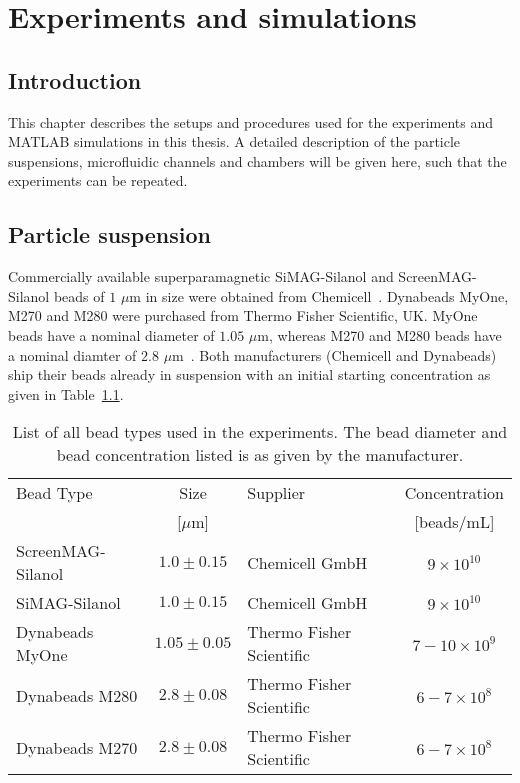 \chapter{Experiments and simulations}\label{ch:experiments}

\section{Introduction}
This chapter describes the setups and procedures used for the experiments and MATLAB simulations in this thesis. A detailed description of the particle suspensions, microfluidic channels and chambers will be given here, such that the experiments can be repeated.

\section{Particle suspension}\label{sec:particleSuspension}
Commercially available superparamagnetic SiMAG-Silanol and ScreenMAG-Silanol beads of $1$ $\mu$m in size were obtained from Chemicell~\cite{chemicell2015}. Dynabeads MyOne, M270 and M280 were purchased from Thermo Fisher Scientific, UK. MyOne beads have a nominal diameter of $1.05$ $\mu$m, whereas M270 and M280 beads have a nominal diamter of $2.8$ $\mu$m~\cite{dynabeads2015}. Both manufacturers (Chemicell and Dynabeads) ship their beads already in suspension with an initial starting concentration as given in Table~\ref{tab:particleSuspensionMaterials}.

\begin{table}[htb]
\begin{center}
\caption[Bead types used in the experiments]{List of all bead types used in the experiments. The bead diameter and bead concentration listed is as given by the manufacturer.}
\vspace{1ex}
\label{tab:particleSuspensionMaterials}
\begin{tabular}{lclc}
\hline
Bead Type 	& Size 				& Supplier 	& Concentration\\ 
					& 	[$\mu$m]  	&  				& [beads/mL]\\
\hline
ScreenMAG-Silanol  	& $1.0 \pm 0.15$				& Chemicell GmbH 	& $9\times10^{10}$ \\
SiMAG-Silanol 			& $1.0 \pm 0.15$				& Chemicell GmbH  	& $9\times10^{10}$ \\
Dynabeads MyOne 	& $1.05 \pm 0.05$ 	& Thermo Fisher Scientific & $7-10\times 10^{9}$ \\
Dynabeads M280 		& $2.8 \pm 0.08$ 		& Thermo Fisher Scientific & $6-7\times10^{8}$ \\
Dynabeads M270 		& $2.8 \pm 0.08$ 		& Thermo Fisher Scientific & $6-7\times10^{8}$ \\  
\hline
\end{tabular}
\end{center}
\end{table}

